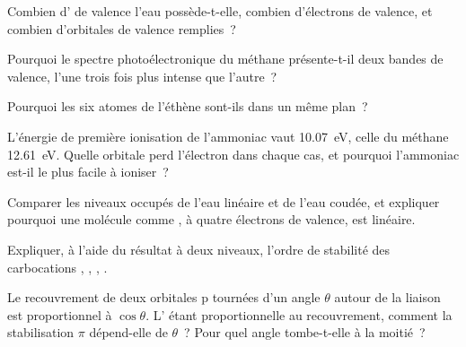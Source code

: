 \begin{exercise}[$\star$]\label{exo:b2:fragment-orbitals:2}
Combien d' de valence l'eau possède-t-elle, combien d'électrons de valence,
et combien d'orbitales de valence remplies~?
\end{exercise}

\begin{exercise}[$\star$]\label{exo:b2:fragment-orbitals:3}
Pourquoi le spectre photoélectronique du méthane présente-t-il deux bandes de valence, l'une
trois fois plus intense que l'autre~?
\end{exercise}

\begin{exercise}[$\star$]\label{exo:b2:fragment-orbitals:4}
Pourquoi les six atomes de l'éthène sont-ils dans un même plan~?
\end{exercise}

\begin{exercise}[$\star\star$]\label{exo:b2:fragment-orbitals:5}
L'énergie de première ionisation de l'ammoniac vaut \qty{10.07}{eV}, celle du méthane
\qty{12.61}{eV}. Quelle orbitale perd l'électron dans chaque cas, et pourquoi l'ammoniac est-il le
plus facile à ioniser~?
\end{exercise}

\begin{exercise}[$\star\star$]\label{exo:b2:fragment-orbitals:6}
Comparer les niveaux occupés de l'eau linéaire et de l'eau coudée, et expliquer pourquoi une molécule
comme , à quatre électrons de valence, est linéaire.
\end{exercise}

\begin{exercise}[$\star\star$]\label{exo:b2:fragment-orbitals:7}
Expliquer, à l'aide du résultat à deux niveaux, l'ordre de stabilité des carbocations
, , , .
\end{exercise}

\begin{exercise}[$\star\star$]\label{exo:b2:fragment-orbitals:8}
Le recouvrement de deux orbitales p tournées d'un angle $\theta$ autour de la liaison est
proportionnel à $\cos\theta$. L' étant proportionnelle au
recouvrement, comment la stabilisation $\pi$ dépend-elle de $\theta$~? Pour quel angle tombe-t-elle
à la moitié~?
\end{exercise}

